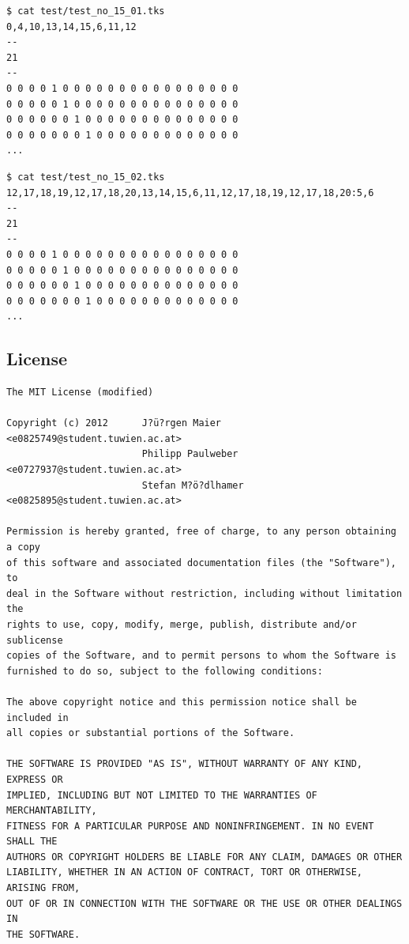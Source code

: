 \documentclass[english,a4paper,oneside]{article}%
\begin{document}
\begin{appendix}
\begin{footnotesize}
\begin{lstlisting}
$ cat test/test_no_15_01.tks 
0,4,10,13,14,15,6,11,12
--
21
--
0 0 0 0 1 0 0 0 0 0 0 0 0 0 0 0 0 0 0 0 0
0 0 0 0 0 1 0 0 0 0 0 0 0 0 0 0 0 0 0 0 0
0 0 0 0 0 0 1 0 0 0 0 0 0 0 0 0 0 0 0 0 0
0 0 0 0 0 0 0 1 0 0 0 0 0 0 0 0 0 0 0 0 0
...
\end{lstlisting}
\end{footnotesize}

\begin{footnotesize}
\begin{lstlisting}
$ cat test/test_no_15_02.tks 
12,17,18,19,12,17,18,20,13,14,15,6,11,12,17,18,19,12,17,18,20:5,6
--
21
--
0 0 0 0 1 0 0 0 0 0 0 0 0 0 0 0 0 0 0 0 0
0 0 0 0 0 1 0 0 0 0 0 0 0 0 0 0 0 0 0 0 0
0 0 0 0 0 0 1 0 0 0 0 0 0 0 0 0 0 0 0 0 0
0 0 0 0 0 0 0 1 0 0 0 0 0 0 0 0 0 0 0 0 0
...
\end{lstlisting}
\end{footnotesize}





\subsection{License}
\begin{scriptsize}
\begin{lstlisting}
The MIT License (modified)

Copyright (c) 2012      J?ü?rgen Maier        <e0825749@student.tuwien.ac.at>
                        Philipp Paulweber   <e0727937@student.tuwien.ac.at>
                        Stefan M?ö?dlhamer    <e0825895@student.tuwien.ac.at>

Permission is hereby granted, free of charge, to any person obtaining a copy
of this software and associated documentation files (the "Software"), to
deal in the Software without restriction, including without limitation the 
rights to use, copy, modify, merge, publish, distribute and/or sublicense
copies of the Software, and to permit persons to whom the Software is
furnished to do so, subject to the following conditions:

The above copyright notice and this permission notice shall be included in
all copies or substantial portions of the Software.

THE SOFTWARE IS PROVIDED "AS IS", WITHOUT WARRANTY OF ANY KIND, EXPRESS OR
IMPLIED, INCLUDING BUT NOT LIMITED TO THE WARRANTIES OF MERCHANTABILITY,
FITNESS FOR A PARTICULAR PURPOSE AND NONINFRINGEMENT. IN NO EVENT SHALL THE
AUTHORS OR COPYRIGHT HOLDERS BE LIABLE FOR ANY CLAIM, DAMAGES OR OTHER
LIABILITY, WHETHER IN AN ACTION OF CONTRACT, TORT OR OTHERWISE, ARISING FROM,
OUT OF OR IN CONNECTION WITH THE SOFTWARE OR THE USE OR OTHER DEALINGS IN
THE SOFTWARE.
\end{lstlisting}
\end{scriptsize}

\end{appendix}
\end{document}
